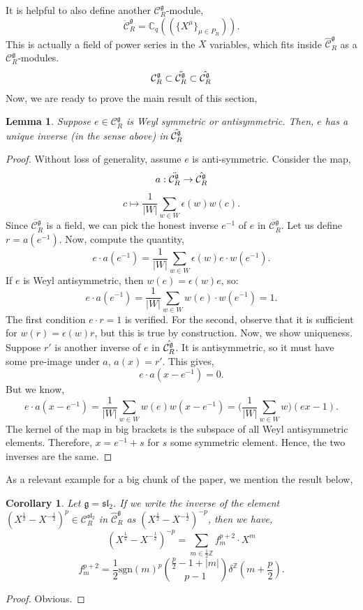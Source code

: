 \documentclass{article}
\newcommand{\Z}{{\mathbb Z}}
\newcommand{\C}{{\mathbb C}}
\newtheorem{corollary}{Corollary}
\newtheorem{lemma}[theorem]{Lemma}
\numberwithin{corollary}{theorem}
\numberwithin{corollary}{proposition}
\begin{document}
It is helpful to also define another $\mathcal{C}^\mathfrak{g}_R$-module, 
$$\ddot{\mathcal{C}}^\mathfrak{g}_R = \C_q ((\{X^\mu \}_{\mu \in P_R})).$$
This is actually a field of power series in the $X$ variables, which fits inside $\hat{\mathcal{C}}^\mathfrak{g}_R$ as a $\mathcal{C}^\mathfrak{g}_R$-modules. 
$$\mathcal{C}^\mathfrak{g}_R \subset \ddot{\mathcal{C}^\mathfrak{g}_R} \subset \Hat{\mathcal{C}^\mathfrak{g}_R}$$
Now, we are ready to prove the main result of this section, 
\begin{lemma}
    Suppose $e \in \mathcal{C}^\mathfrak{g}_R$ is Weyl symmetric or antisymmetric. Then, $e$ has a unique inverse (in the sense above) in $\Hat{\mathcal{C}^\mathfrak{g}_R}$
\end{lemma}
\begin{proof}
    Without loss of generality, assume $e$ is anti-symmetric. Consider the map,
$$a: \ddot{\mathcal{C}^\mathfrak{g}_R} \rightarrow \Hat{\mathcal{C}^\mathfrak{g}_R}$$
$$c\mapsto \frac{1}{|W|}\sum_{w\in W} \epsilon(w) w(c). $$
Since $\ddot{\mathcal{C}^\mathfrak{g}_R}$ is a field, we can pick the honest inverse $e^{-1}$ of $e$ in $\ddot{\mathcal{C}^\mathfrak{g}_R}$. Let us define $r = a(e^{-1})$. Now, compute the quantity,
$$e \cdot a(e^{-1}) = \frac{1}{|W|}\sum_{w\in W} \epsilon(w) e\cdot  w(e^{-1}) .$$
If $e$ is Weyl antisymmetric, then $w(e) = \epsilon(w) e$, so:
$$e \cdot a(e^{-1}) = \frac{1}{|W|}\sum_{w\in W}w(e)\cdot w(e^{-1}) = 1.$$
The first condition $e\cdot r=1$ is verified. For the second, observe that it is sufficient for $w(r) = \epsilon (w) r$, but this is true by construction. Now, we show uniqueness. Suppose $r'$ is another inverse of $e$ in $\Hat{\mathcal{C}^\mathfrak{g}_R}$. It is antisymmetric, so it must have some pre-image under $a$, $a(x) = r'$. This gives, 
$$e\cdot a(x-e^{-1})=0 .$$
But we know, 
$$e\cdot a(x-e^{-1})=\frac{1}{|W|}\sum_{w\in W}w(e)w(x-e^{-1}) = \bigg(\frac{1}{|W|}\sum_{w\in W}w\bigg)(ex -1).$$
The kernel of the map in big brackets is the subspace of all Weyl antisymmetric elements. Therefore, $x= e^{-1} +s$ for $s$ some symmetric element. Hence, the two inverses are the same.
\end{proof}

As a relevant example for a big chunk of the paper, we mention the result below, 

\begin{corollary}
Let $\mathfrak{g=sl_2}$. If we write the inverse of the element $(X^{\frac{1}{2}}-X^{-\frac{1}{2}})^p \in \mathcal{C}^\mathfrak{sl_2}_R$ in $\hat{\mathcal{C}}^\mathfrak{g}_R$ as $(X^{\frac{1}{2}}-X^{-\frac{1}{2}})^{-p}$, then we have, 
$$(X^{\frac{1}{2}}-X^{-\frac{1}{2}})^{-p} = \sum_{m\in \frac{1}{2} \Z}f^{p+2}_m \cdot X^m$$
$$f^{p+2}_m = \frac{1}{2}\mathrm{sgn}(m)^p\binom{\frac{p}{2}-1+|m|}{p-1}\delta^\Z\left(m+\frac{p}{2}\right).$$
\end{corollary}
\begin{proof}
    Obvious.
\end{proof}
\end{document}
